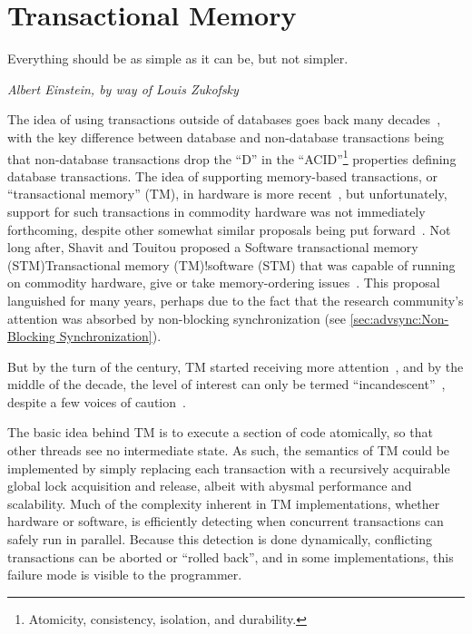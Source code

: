 
\section{Transactional Memory}
\label{sec:future:Transactional Memory}
\epigraph{Everything should be as simple as it can be, but not simpler.}
	 {\emph{Albert Einstein, by way of Louis Zukofsky}}

The idea of using transactions outside of databases goes back many
decades~\cite{DBLomet1977SIGSOFT,Knight:1986:AMF:319838.319854,Herlihy93a},
with the key difference between
database and non-database transactions being that non-database transactions
drop the ``D'' in the ``ACID''\footnote{
	Atomicity, consistency, isolation, and durability.}
properties defining database transactions.
The idea of supporting memory-based transactions, or ``transactional memory''
(TM), in hardware
is more recent~\cite{Herlihy93a}, but unfortunately, support for such
transactions in commodity hardware was not immediately forthcoming,
despite other somewhat similar proposals being put forward~\cite{JMStone93}.
Not long after, Shavit and Touitou proposed a
{Software transactional memory (STM)}{Transactional memory (TM)!software (STM)}
that was capable of running on commodity
hardware, give or take memory-ordering issues~\cite{Shavit95}.
This proposal languished for many years, perhaps due to the fact that
the research community's attention was absorbed by non-blocking
synchronization (see \cref{sec:advsync:Non-Blocking Synchronization}).

But by the turn of the century, TM started receiving
more attention~\cite{Martinez01a,Rajwar01a}, and by the middle of the
decade, the level of interest can only be termed
``incandescent''~\cite{MauriceHerlihy2005-TM-manifesto.pldi,
DanGrossman2007TMGCAnalogy}, despite a few voices of
caution~\cite{Blundell2005DebunkTM,McKenney2007PLOSTM}.

The basic idea behind TM is to execute a section of
code atomically, so that other threads see no intermediate state.
As such, the semantics of TM could be implemented
by simply replacing each transaction with a recursively acquirable
global lock acquisition and release, albeit with abysmal performance
and scalability.
Much of the complexity inherent in TM implementations, whether hardware
or software, is efficiently detecting when concurrent transactions can safely
run in parallel.
Because this detection is done dynamically, conflicting transactions
can be aborted or ``rolled back'', and in some implementations, this
failure mode is visible to the programmer.

